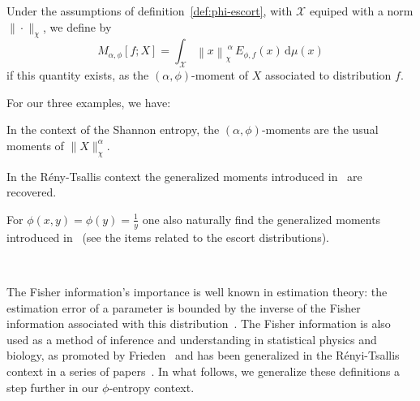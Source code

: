 \documentclass[entropy,article,submit,moreauthors,pdftex]{Definitions/mdpi}
\newcounter{GaussExample}%
\newcounter{qGaussExample}%
\newcounter{arcsineExample}%
\def\dmu{\mathrm{d}\mu}%
\def\X{\mathcal{X}}%
\begin{document}
\begin{Definition}
\label{def:phi-moment}
%
  Under the  assumptions of  definition~\ref{def:phi-escort}, with  $\X$ equiped
  with a norm $\| \cdot \|_\chi$, we define by
  \begin{equation}\label{eq:phi-moment}
  M_{\alpha,\phi}[f;X] = \int_\X \left\| x \right\|_\chi^{\: \alpha} \,
  E_{\phi,f}(x) \, \dmu(x)
  \end{equation}
  if this  quantity exists, as  the $(\alpha,\phi)$-moment of $X$  associated to
  distribution $f$.
\end{Definition}
%
For our three examples, we have:
%
\begin{Example}
  In the  context of  the Shannon entropy,  the $(\alpha,\phi)$-moments  are the
  usual moments of $\|X\|_\chi^\alpha$.
\end{Example}
%
\begin{Example}
  In   the   R\'eny-Tsallis   context   the   generalized   moments   introduced
  in~\cite{TsaMen98, MarNic00} are recovered.
\end{Example}
%
\begin{Example}
  For  $\phi(x,y)  =  \phi(y)  =   \frac{1}{y}$  one  also  naturally  find  the
  generalized  moments introduced  in~\cite{TsaMen98, MarNic00}  (see the  items
  related to the escort distributions).
\end{Example}

\

The  Fisher information's  importance is  well known  in estimation  theory: the
estimation  error  of a  parameter  is  bounded by  the  inverse  of the  Fisher
information associated with this distribution~\cite{Kay93, CovTho06}. The Fisher
information  is  also  used  as  a method  of  inference  and  understanding  in
statistical physics  and biology,  as promoted  by Frieden~\cite{Fri04}  and has
been   generalized   in   the   R\'enyi-Tsallis   context   in   a   series   of
papers~\cite{Ham78,   ChiPen00,   CasChi02,  LutYan05,   LutLv12,   Ber12:06_1,
  Ber12:06_2, Ber13}.  In  what follows, we generalize these  definitions a step
further in our $\phi$-entropy context.
\end{document}
